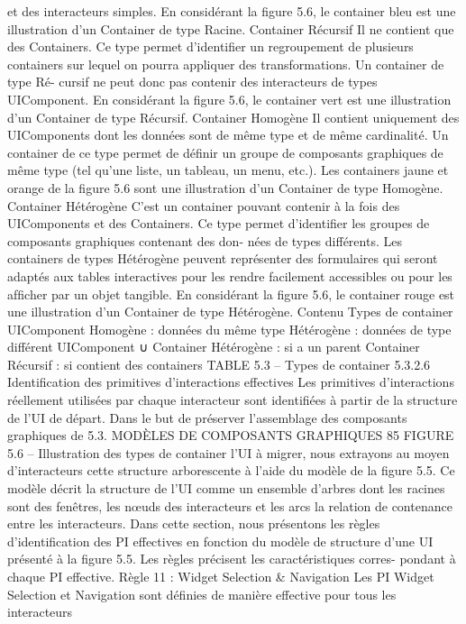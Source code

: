 \documentclass{article}
\begin{document}
et des interacteurs simples. En considérant la ﬁgure 5.6, le container bleu est une illustration d’un
Container de type Racine.
Container Récursif
Il ne contient que des Containers. Ce type permet d’identiﬁer un regroupement
de plusieurs containers sur lequel on pourra appliquer des transformations. Un container de type Ré-
cursif ne peut donc pas contenir des interacteurs de types UIComponent. En considérant la ﬁgure 5.6,
le container vert est une illustration d’un Container de type Récursif.
Container Homogène
Il contient uniquement des UIComponents dont les données sont de même
type et de même cardinalité. Un container de ce type permet de déﬁnir un groupe de composants
graphiques de même type (tel qu’une liste, un tableau, un menu, etc.). Les containers jaune et orange
de la ﬁgure 5.6 sont une illustration d’un Container de type Homogène.
Container Hétérogène
C’est un container pouvant contenir à la fois des UIComponents et des
Containers. Ce type permet d’identiﬁer les groupes de composants graphiques contenant des don-
nées de types différents. Les containers de types Hétérogène peuvent représenter des formulaires qui
seront adaptés aux tables interactives pour les rendre facilement accessibles ou pour les afﬁcher par
un objet tangible. En considérant la ﬁgure 5.6, le container rouge est une illustration d’un Container
de type Hétérogène.
Contenu
Types de container
{UIComponent}
Homogène : données du même type
Hétérogène : données de type différent
{UIComponent}
∪
{Container}
Hétérogène : si a un parent
{Container}
Récursif : si contient des containers
TABLE 5.3 – Types de container
5.3.2.6
Identiﬁcation des primitives d’interactions effectives
Les primitives d’interactions réellement utilisées par chaque interacteur sont identiﬁées à partir de
la structure de l’UI de départ. Dans le but de préserver l’assemblage des composants graphiques de
5.3. MODÈLES DE COMPOSANTS GRAPHIQUES
85
FIGURE 5.6 – Illustration des types de container
l’UI à migrer, nous extrayons au moyen d’interacteurs cette structure arborescente à l’aide du modèle
de la ﬁgure 5.5. Ce modèle décrit la structure de l’UI comme un ensemble d’arbres dont les racines
sont des fenêtres, les nœuds des interacteurs et les arcs la relation de contenance entre les interacteurs.
Dans cette section, nous présentons les règles d’identiﬁcation des PI effectives en fonction du
modèle de structure d’une UI présenté à la ﬁgure 5.5. Les règles précisent les caractéristiques corres-
pondant à chaque PI effective.
Règle 11 : Widget Selection & Navigation
Les PI Widget Selection et Navigation sont déﬁnies de manière effective pour tous les interacteurs
\end{document}
